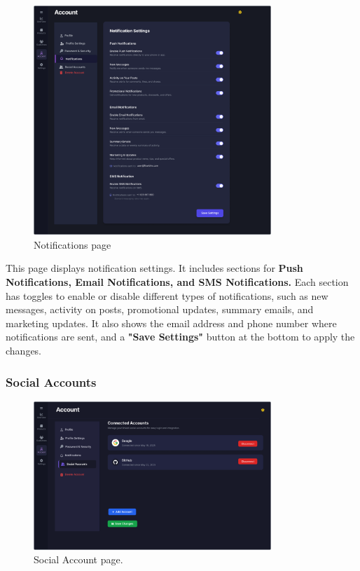\documentclass[12pt]{article}
\begin{document}
	\begin{figure}[H]
		\centering
		\includegraphics[width=0.8\textwidth]{pictures/admin/Notifications_Admin}
		\caption{Notifications page}\label{fig:figure7}
	\end{figure}
	This page displays notification settings.
	It includes sections for \textbf{Push Notifications, Email Notifications, and SMS Notifications.} Each section has toggles to enable or disable different types of notifications, such as new messages, activity on posts, promotional updates, summary emails, and marketing updates.
	It also shows the email address and phone number where notifications are sent, and a \textbf{"Save Settings"} button at the bottom to apply the changes.

	\newpage
	\subsubsection{Social Accounts}

	\begin{figure}[h]
		\centering
		\includegraphics[width=0.8\textwidth]{pictures/admin/Connected_Accounts_Admin}
		\caption{Social Account page.}\label{fig:figure8}
	\end{figure}
	
\end{document}
